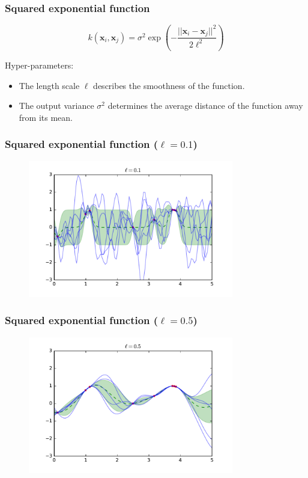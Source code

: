 \documentclass{beamer}
\begin{document}
\begin{frame}
    \frametitle{Squared exponential function}

    $$k(\mathbf{x}_i, \mathbf{x}_j) = \sigma^2 \exp(-  \frac{||\mathbf{x}_i - \mathbf{x}_j||^2}{2 \ell^2})$$

    Hyper-parameters:
    \begin{itemize}
        \item The length scale $\ell$ describes the smoothness of the function.
        \item The output variance $\sigma^2$ determines the average distance of the function away from its mean.
    \end{itemize}
\end{frame}


\begin{frame}
    \frametitle{Squared exponential function ($\ell=0.1$)}

    \begin{figure}
        \centering
        \includegraphics[width=0.8\textwidth]{./figures/rbf-01.pdf}
    \end{figure}
\end{frame}

\begin{frame}
    \frametitle{Squared exponential function ($\ell=0.5$)}

    \begin{figure}
        \centering
        \includegraphics[width=0.8\textwidth]{./figures/rbf-05.pdf}
    \end{figure}
\end{frame}
\end{document}
